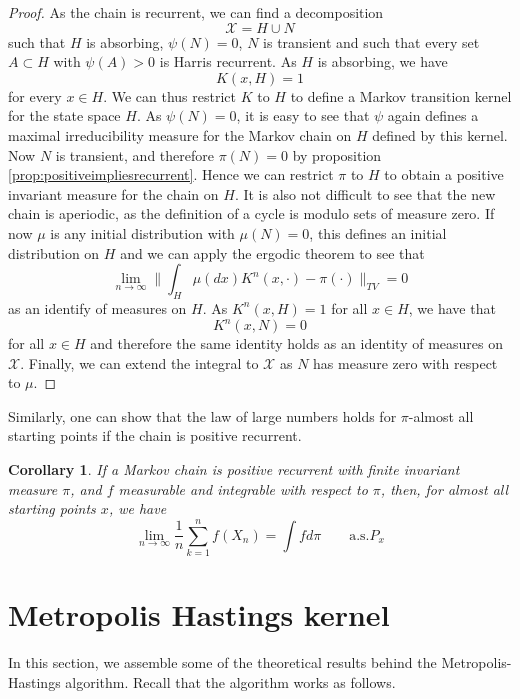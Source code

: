 \documentclass[a4paper, draft]{article}
\theoremstyle{own}
\newtheorem{cor}[thm]{Corollary}
\theoremstyle{remark}
\begin{document}
\begin{proof}
	As the chain is recurrent, we can find a decomposition 
	$$
	{\mathcal X} = H \cup N
	$$	
	such that $H$ is absorbing, $\psi(N)=0$, $N$ is transient and such that every set $A \subset H$ with $\psi(A) > 0$ is Harris recurrent. As $H$ is absorbing, we have
	$$
	K(x,H) = 1
	$$
	for every $x \in H$. We can thus restrict $K$ to $H$ to define a Markov transition kernel for the state space $H$. As $\psi(N) = 0$, it is easy to see that $\psi$ again defines a maximal irreducibility measure for the Markov chain on $H$ defined by this kernel. Now $N$ is transient, and therefore $\pi(N) = 0$ by proposition \ref{prop:positiveimpliesrecurrent}. Hence we can restrict $\pi$ to $H$ to obtain a positive invariant
	measure for the chain on $H$. It is also not difficult to see that the new chain is aperiodic, as the definition of a cycle is modulo sets of measure zero. If now $\mu$ is any initial distribution with $\mu(N) = 0$, this defines an initial distribution on $H$ and we can apply the ergodic theorem to see that
	$$
	\lim_{n \rightarrow \infty} \| \int_H \mu(dx)K^n(x, \cdot) - \pi(\cdot) \|_{TV} = 0
	$$
	as an identify of measures on $H$. As $K^n(x,H) = 1$ for all $x \in H$, we have that
	$$
	K^n(x,N) = 0
	$$
	for all $x \in H$ and therefore the same identity holds as an identity of measures on 
	${\mathcal X}$. Finally, we can extend the integral to ${\mathcal X}$ as $N$ has measure zero with respect to $\mu$.
\end{proof}

Similarly, one can show that the law of large numbers holds for $\pi$-almost all starting points if the chain is positive recurrent. 

\begin{cor}
	If a Markov chain is positive recurrent with finite invariant measure $\pi$, and $f$ measurable and integrable with respect to $\pi$, then, for almost all starting points $x$, we have
	$$
	\lim_{n \rightarrow \infty} \frac{1}{n} \sum_{k=1}^n f(X_n) = \int f d\pi 
	\qquad \text{a.s.} P_x
	$$
\end{cor}

\section{Metropolis Hastings kernel}
\label{sec:metropolishastingstheory}

In this section, we assemble some of the theoretical results behind the Metropolis-Hastings algorithm. Recall that the algorithm works as follows.
\end{document}

